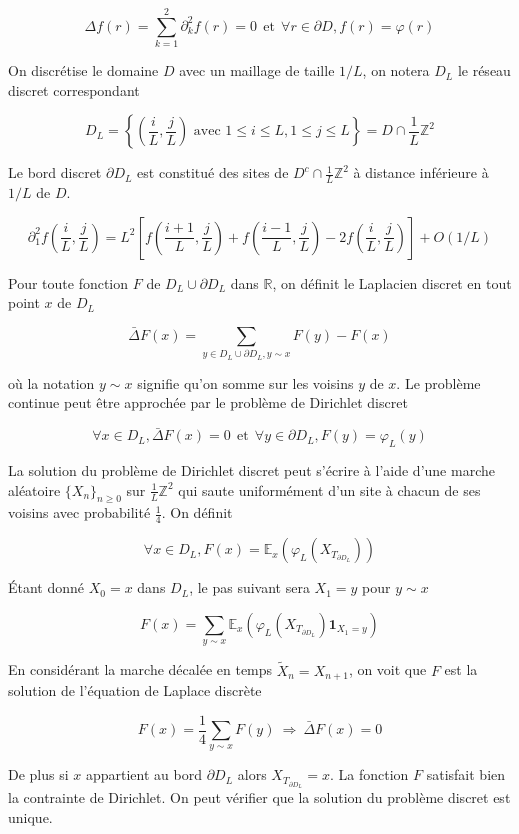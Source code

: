 \documentclass[10pt,a4paper,oneside]{article}
\begin{document}
\begin{itemize}
\[ \Delta f(r) = \sum_{k = 1}^2 \partial_k^2 f(r) = 0\ \ \text{et}\ \ \forall r \in \partial D, f(r) = \varphi(r) \]

On discrétise le domaine $D$ avec un maillage de taille $1 / L$, on notera $D_L$ le réseau discret correspondant

\[ D_L = \left\lbrace \left( \frac{i}{L},\frac{j}{L} \right) \text{ avec } 1 \leq i \leq L, 1 \leq j \leq L \right\rbrace = D \cap \frac{1}{L} \mathbb{Z}^2 \]

Le bord discret $\partial D_L$ est constitué des sites de $D^c \cap \frac{1}{L} \mathbb{Z}^2$ à distance inférieure à $1 / L$ de $D$.

\[ \partial_1^2 f\left( \frac{i}{L},\frac{j}{L} \right) = L^2 \left[ f\left( \frac{i + 1}{L},\frac{j}{L} \right) + f\left( \frac{i - 1}{L},\frac{j}{L} \right) - 2f\left( \frac{i}{L},\frac{j}{L} \right) \right] + O(1/L) \]

Pour toute fonction $F$ de $D_L \cup \partial D_L$ dans $\mathbb{R}$, on définit le Laplacien discret en tout point $x$ de $D_L$

\[ \bar{\Delta} F(x) = \sum_{y \in D_L \cup \partial D_L, y \sim x} F(y) - F(x) \]

où la notation $y \sim x$ signifie qu'on somme sur les voisins $y$ de $x$. Le problème continue peut être approchée par le problème de Dirichlet discret

\[ \forall x \in D_L, \bar{\Delta} F(x) = 0\ \ \text{et}\ \ \forall y \in \partial D_L, F(y) = \varphi_L(y) \]

La solution du problème de Dirichlet discret peut s'écrire à l'aide d'une marche aléatoire $\{ X_n \}_{n \geq 0}$ sur $\frac{1}{L} \mathbb{Z}^2$ qui saute uniformément d'un site à chacun de ses voisins avec probabilité $\frac{1}{4}$. On définit

\[ \forall x \in D_L, F(x) = \mathbb{E}_x \left( \varphi_L(X_{T_{\partial D_L}}) \right) \]

Étant donné $X_0 = x$ dans $D_L$, le pas suivant sera $X_1 = y$ pour $y \sim x$

\[ F(x) = \sum_{y \sim x} \mathbb{E}_x \left( \varphi_L(X_{T_{\partial D_L}}) \textbf{1}_{X_1 = y} \right) \]

En considérant la marche décalée en temps $\tilde{X}_n = X_{n + 1}$, on voit que $F$ est la solution de l'équation de Laplace discrète

\[ F(x) = \frac{1}{4} \sum_{y \sim x} F(y)\ \Rightarrow\ \bar{\Delta} F(x) = 0 \]

De plus si $x$ appartient au bord $\partial D_L$ alors $X_{T_{\partial D_L}} = x$. La fonction $F$ satisfait bien la contrainte de Dirichlet. On peut vérifier que la solution du problème discret est unique.


\end{itemize}
\end{document}
